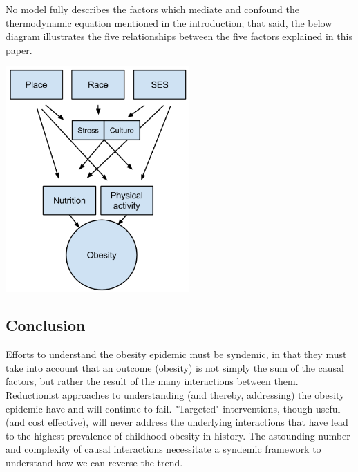 \documentclass[11pt]{article}
\begin{document}
\begin{multicols}{2}
No model fully describes the factors which mediate and confound the thermodynamic equation mentioned in the introduction; that said, the below diagram illustrates the five relationships between the five factors explained in this paper.
\begin{center}
\includegraphics[width=7cm]{flow}
\end{center}


\subsection*{Conclusion}
Efforts to understand the obesity epidemic must be syndemic, in that they must take into account that an outcome (obesity) is not simply the sum of the causal factors, but rather the result of the many interactions between them.   Reductionist approaches to understanding (and thereby, addressing) the obesity epidemic have and will continue to fail.  "Targeted" interventions, though useful (and cost effective), will never address the underlying interactions that have lead to the highest prevalence of childhood obesity in history. The astounding number and complexity of causal interactions necessitate a syndemic framework to understand how we can reverse the trend.\cite{Fardet2014}







\end{multicols}


\end{document}
